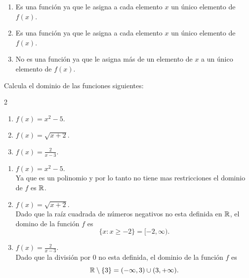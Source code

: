 \documentclass[12pt,a4paper]{article}
\begin{document}
    \begin{solucion}
        \begin{enumerate}
            \item[(a)] Es una función ya que le asigna a cada elemento $x$ un único elemento de $f(x)$.
            \item[(b)] Es una función ya que le asigna a cada elemento $x$ un único elemento de $f(x)$.
            \item[(c)] No es una función ya que le asigna más de un elemento de $x$ a un único elemento de $f(x)$.  
        \end{enumerate}
    \end{solucion}

    \begin{problema}
        Calcula el dominio de las funciones siguientes:
        \begin{multicols}{2}
            \begin{enumerate}
                \item[(a)] $f(x)=x^{2}-5.$
                \item[(b)] $f(x)=\sqrt{x+2}.$
                \item[(c)] $f(x)=\frac{2}{x-3}.$
            \end{enumerate}
        \end{multicols}
    \end{problema}

    \begin{solucion}
        \begin{enumerate}
            \item[(a)] $f(x)=x^{2}-5$.\\
            Ya que es un polinomio y por lo tanto no tiene mas restricciones el dominio de $f$ es $\mathbb{R}$.
            \item[(b)] $f(x)=\sqrt{x+2}$.\\
            Dado que la raíz cuadrada de números negativos no esta definida en $\mathbb{R}$, el domino de la función $f$ es
            \begin{equation*}
                \{x:x\geq-2\}=[-2,\infty).
            \end{equation*}
            \item[(c)] $f(x)=\frac{2}{x-3}$.\\
            Dado que la división por 0 no esta definida, el dominio de la función $f$ es
            \begin{equation*}
                \mathbb{R}\setminus\{3\}=(-\infty,3)\cup(3,+\infty).
            \end{equation*}
        \end{enumerate}
    \end{solucion}
\end{document}

